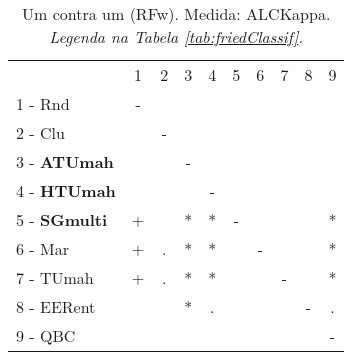 \begin{table}[h]
\caption{Um contra um (RFw). Medida: ALCKappa. \textit{Legenda na Tabela \ref{tab:friedClassif}.}}
\begin{center}\begin{tabular}{lcc|cc|cc|cc|c}
 			& 1 & 2 & 3 & 4 & 5 & 6 & 7 & 8 & 9\\
1 - Rnd  	& - &   &   &   &   &   &   &   &   \\
2 - Clu  	&   & - &   &   &   &   &   &   &   \\ \hline
3 - \textbf{ATUmah}	&   &   & - &   &   &   &   &   &   \\
4 - \textbf{HTUmah}	&   &   &   & - &   &   &   &   &   \\ \hline
5 - \textbf{SGmulti}	& + &   & * & * & - &   &   &   & * \\
6 - Mar  	& + & . & * & * &   & - &   &   & * \\ \hline
7 - TUmah	& + & . & * & * &   &   & - &   & * \\
8 - EERent	&   &   & * & . &   &   &   & - & . \\ \hline
9 - QBC  	&   &   &   &   &   &   &   &   & - \\\end{tabular}
\label{stratsALCKappaFriedRFwRedux}
\end{center}
\end{table}